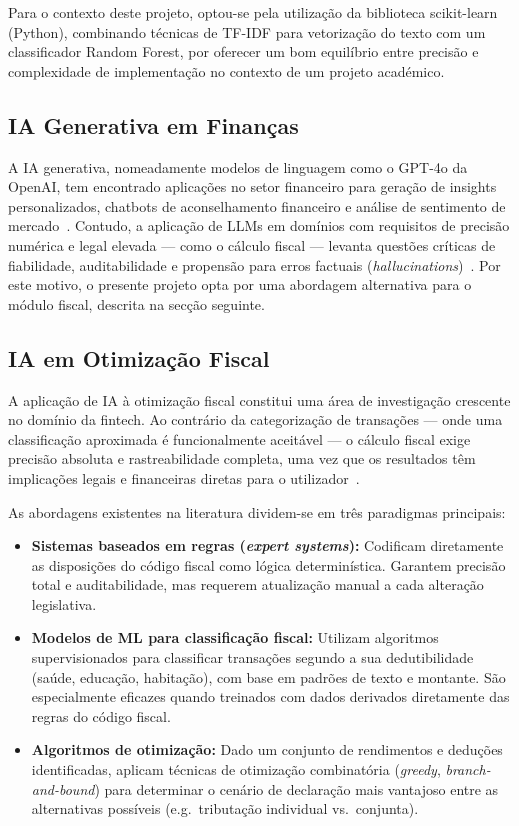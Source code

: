 Para o contexto deste projeto, optou-se pela utilização da biblioteca scikit-learn (Python), combinando técnicas de TF-IDF para vetorização do texto com um classificador Random Forest, por oferecer um bom equilíbrio entre precisão e complexidade de implementação no contexto de um projeto académico.

\subsection{IA Generativa em Finanças}

A \ac{IA} generativa, nomeadamente modelos de linguagem como o GPT-4o da OpenAI, tem encontrado aplicações no setor financeiro para geração de insights personalizados, chatbots de aconselhamento financeiro e análise de sentimento de mercado~\cite{openai2024}. Contudo, a aplicação de \ac{LLM}s em domínios com requisitos de precisão numérica e legal elevada --- como o cálculo fiscal --- levanta questões críticas de fiabilidade, auditabilidade e propensão para erros factuais (\textit{hallucinations})~\cite{llm-reliability2024}. Por este motivo, o presente projeto opta por uma abordagem alternativa para o módulo fiscal, descrita na secção seguinte.


\subsection{IA em Otimização Fiscal}
\label{sec:ea-fiscal-ia}

A aplicação de \ac{IA} à otimização fiscal constitui uma área de investigação crescente no domínio da fintech. Ao contrário da categorização de transações --- onde uma classificação aproximada é funcionalmente aceitável --- o cálculo fiscal exige precisão absoluta e rastreabilidade completa, uma vez que os resultados têm implicações legais e financeiras diretas para o utilizador~\cite{tax-ai2023}.

As abordagens existentes na literatura dividem-se em três paradigmas principais:

\begin{itemize}
    \item \textbf{Sistemas baseados em regras (\textit{expert systems}):} Codificam diretamente as disposições do código fiscal como lógica determinística. Garantem precisão total e auditabilidade, mas requerem atualização manual a cada alteração legislativa.
    \item \textbf{Modelos de \ac{ML} para classificação fiscal:} Utilizam algoritmos supervisionados para classificar transações segundo a sua dedutibilidade (saúde, educação, habitação), com base em padrões de texto e montante. São especialmente eficazes quando treinados com dados derivados diretamente das regras do código fiscal.
    \item \textbf{Algoritmos de otimização:} Dado um conjunto de rendimentos e deduções identificadas, aplicam técnicas de otimização combinatória (\textit{greedy}, \textit{branch-and-bound}) para determinar o cenário de declaração mais vantajoso entre as alternativas possíveis (e.g.\ tributação individual vs.\ conjunta).
\end{itemize}


